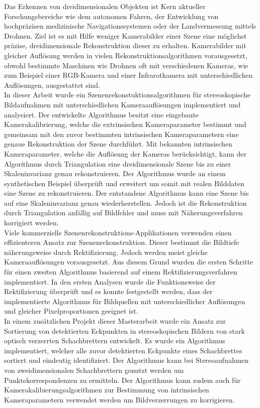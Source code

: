 
Das Erkennen von dreidimensionalen Objekten ist Kern aktueller Forschungsbereiche wie dem autonomen Fahren, der Entwicklung von hochpräzisen medizinische Navigationssystemen oder der Landvermessung mittels Drohnen. Ziel ist es mit Hilfe weniger Kamerabilder einer Szene eine möglichst präzise, dreidimensionale Rekonstruktion dieser zu erhalten. Kamerabilder mit gleicher Auflösung werden in vielen Rekonstruktionsalgorithmen vorausgesetzt, obwohl bestimmte Maschinen wie Drohnen oft mit verschiedenen Kameras, wie zum Beispiel einer RGB-Kamera und einer Infrarotkamera mit unterschiedlichen Auflösungen, ausgestattet sind.   \\

In dieser Arbeit wurde ein Szenenrekonstuktionsalgorithmen für stereoskopische Bildaufnahmen mit unterschiedlichen Kameraauflösungen implementiert und analysiert. Der entwickelte Algorithmus besitzt eine eingebaute Kamerakalibrierung, welche die extrinsischen Kameraparameter bestimmt und gemeinsam mit den zuvor bestimmten intrinsischen Kameraparametern eine genaue Rekonstruktion der Szene durchführt. Mit bekannten intrinsischen Kameraparameter, welche die Auflösung der Kameras berücksichtigt, kann der Algorithmus durch Triangulation eine dreidimensionale Szene bis zu einer Skaleninvarianz genau rekonstruieren. Der Algorithmus wurde an einem synthetischen Beispiel überprüft und erweitert um somit mit realen Bilddaten eine Szene zu rekonstruieren. Der entstandene Algorithmus kann eine Szene bis auf eine Skaleninvarianz genau wiederherstellen. Jedoch ist die Rekonstruktion durch Triangulation anfällig auf Bildfehler und muss mit Näherungsverfahren korrigiert werden.\\

Viele kommerzielle Szenenrekonstruktions-Applikationen verwenden einen effizienteren Ansatz zur Szenenrekonstruktion. Dieser bestimmt die Bildtiefe näherungsweise durch Rektifizierung. Jedoch werden meist gleiche Kameraauflösungen vorausgesetzt. Aus diesem Grund wurden die ersten Schritte für einen zweiten Algorithmus basierend auf einem Rektifizierungsverfahren implementiert. In den ersten Analysen wurde die Funktionsweise der Rektifizierung überprüft und es konnte festgestellt werden, dass der implementierte Algorithmus für Bildquellen mit unterschiedlicher Auflösungen und gleicher Pixelproportionen geeignet ist.\\

In einem zusätzlichen Projekt dieser Masterarbeit wurde ein Ansatz zur Sortierung von detektierten Eckpunkten in stereoskopischen Bildern von stark optisch verzerrten Schachbrettern entwickelt. Es wurde ein Algorithmus implementiert, welcher alle zuvor detektierten Eckpunkte eines Schachbrettes sortiert und eindeutig identifiziert. Der Algorithmus kann bei Stereoaufnahmen von zweidimensionalen Schachbrettern genutzt werden um Punktekorrespondenzen zu ermitteln. Der Algorithmus kann zudem auch für  Kamerakalibierungsalgorithmen zur Bestimmung von intrinsischen Kameraparametern verwendet werden um Bildverzerrungen zu korrigieren.  

